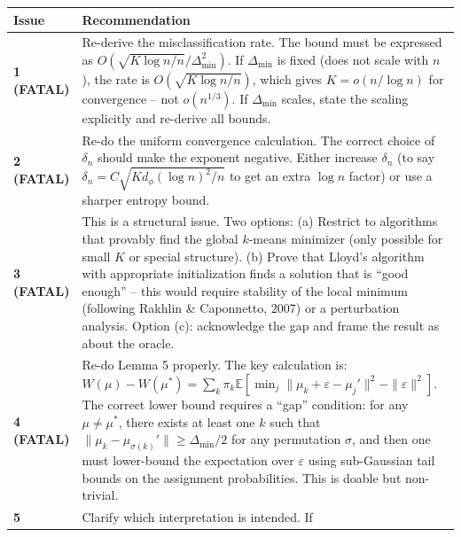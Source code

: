 \documentclass[
  12pt,
]{ctexart}
\begin{document}
\begin{longtable}[]{@{}
  >{\raggedright\arraybackslash}p{}
  >{\raggedright\arraybackslash}p{}@{}}
\toprule\noalign{}
\begin{minipage}[b]{\linewidth}\raggedright
Issue
\end{minipage} & \begin{minipage}[b]{\linewidth}\raggedright
Recommendation
\end{minipage} \\
\midrule\noalign{}
\endhead
\bottomrule\noalign{}
\endlastfoot
\textbf{1 (FATAL)} & Re-derive the misclassification rate. The bound
must be expressed as \(O(\sqrt{K \log n / n} / \Delta_{\min}^2)\). If
\(\Delta_{\min}\) is fixed (does not scale with \(n\)), the rate is
\(O(\sqrt{K \log n / n})\), which gives \(K = o(n / \log n)\) for
convergence -- not \(o(n^{1/3})\). If \(\Delta_{\min}\) scales, state
the scaling explicitly and re-derive all bounds. \\
\textbf{2 (FATAL)} & Re-do the uniform convergence calculation. The
correct choice of \(\delta_n\) should make the exponent negative. Either
increase \(\delta_n\) (to say
\(\delta_n = C \sqrt{K d_\phi (\log n)^2 / n}\) to get an extra
\(\log n\) factor) or use a sharper entropy bound. \\
\textbf{3 (FATAL)} & This is a structural issue. Two options: (a)
Restrict to algorithms that provably find the global \(k\)-means
minimizer (only possible for small \(K\) or special structure). (b)
Prove that Lloyd's algorithm with appropriate initialization finds a
solution that is ``good enough'' -- this would require stability of the
local minimum (following Rakhlin \& Caponnetto, 2007) or a perturbation
analysis. Option (c): acknowledge the gap and frame the result as about
the oracle. \\
\textbf{4 (FATAL)} & Re-do Lemma 5 properly. The key calculation is:
\(W(\mu) - W(\mu^*) = \sum_k \pi_k \mathbb{E}[\min_j \|\mu_k + \varepsilon - \mu_j'\|^2 - \|\varepsilon\|^2]\).
The correct lower bound requires a ``gap'' condition: for any
\(\mu \neq \mu^*\), there exists at least one \(k\) such that
\(\|\mu_k - \mu_{\sigma(k)}'\| \geq \Delta_{\min}/2\) for any
permutation \(\sigma\), and then one must lower-bound the expectation
over \(\varepsilon\) using sub-Gaussian tail bounds on the assignment
probabilities. This is doable but non-trivial. \\
\textbf{5} & Clarify which interpretation is intended. If

\end{longtable}
\end{document}
